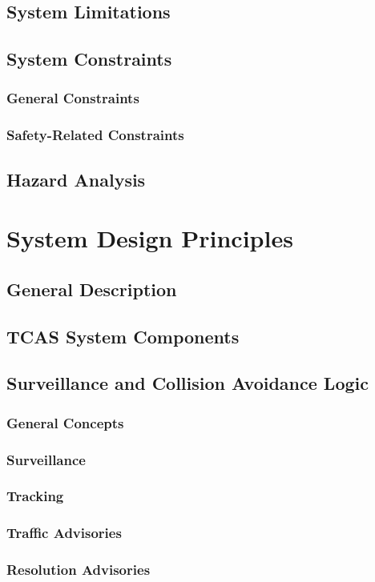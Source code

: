 \documentclass[12pt]{report}
\begin{document}
\section{System Limitations}
\section{System Constraints}
\subsection{General Constraints}
\subsection{Safety-Related Constraints}
\section{Hazard Analysis}

\chapter{System Design Principles}
\section{General Description}
\section{TCAS System Components}
\section{Surveillance and Collision Avoidance Logic}
\subsection{General Concepts}
\subsection{Surveillance}
\subsection{Tracking}
\subsection{Traffic Advisories}
\subsection{Resolution Advisories}
\end{document}

